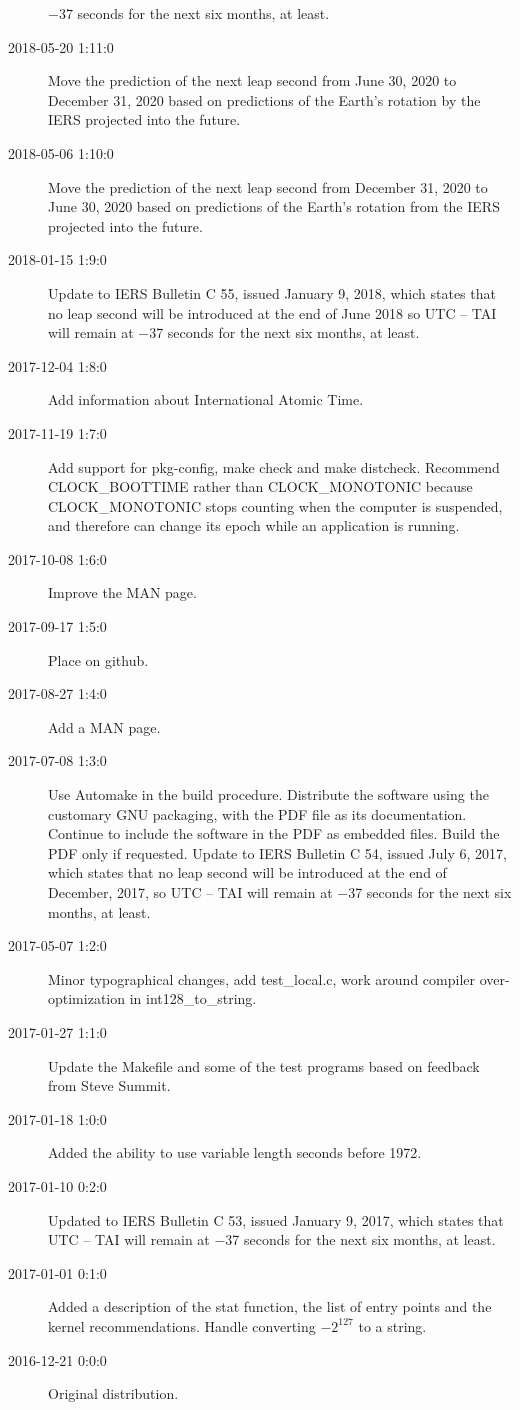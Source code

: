 \documentclass[letterpaper,twoside]{article}
\begin{document}
\begin{description}
  \num{-37} seconds for the next six months, at least.
\item[2018-05-20 1:11:0] Move the prediction of the next leap second
  from June 30, 2020 to December 31, 2020 based on predictions of
  the Earth's rotation by the IERS projected into the future.
\item[2018-05-06 1:10:0] Move the prediction of the next leap second
  from December 31, 2020 to June 30, 2020 based on predictions
  of the Earth's rotation from the IERS projected into the future.
\item[2018-01-15 1:9:0] Update to IERS Bulletin C 55, issued
  January 9, 2018, which states that no leap second will be introduced
  at the end of June 2018 so UTC -- TAI will remain at \num{-37} seconds
  for the next six months, at least.
\item[2017-12-04 1:8:0] Add information about International Atomic Time.
\item[2017-11-19 1:7:0] Add support for pkg-config, make check and
  make distcheck.  Recommend CLOCK\_BOOTTIME rather than CLOCK\_MONOTONIC
  because CLOCK\_MONOTONIC stops counting when the computer is suspended,
  and therefore can change its epoch while an application is running.
\item[2017-10-08 1:6:0] Improve the MAN page.
\item[2017-09-17 1:5:0] Place on github.
\item[2017-08-27 1:4:0] Add a MAN page.
\item[2017-07-08 1:3:0] Use Automake in the build procedure.
  Distribute the software using the customary GNU packaging,
  with the PDF file as its documentation.  Continue to include
  the software in the PDF as embedded files.  Build the PDF
  only if requested.  Update to IERS Bulletin C 54, issued
  July 6, 2017, which states that no leap second will be introduced
  at the end of December, 2017, so UTC -- TAI will remain at
  \num{-37} seconds for the next six months, at least.
\item[2017-05-07 1:2:0] Minor typographical changes, add test\_local.c,
  work around compiler over-optimization in int128\_to\_string.
\item[2017-01-27 1:1:0] Update the Makefile and some of the test programs
  based on feedback from Steve Summit.
\item[2017-01-18 1:0:0] Added the ability to use variable length seconds
  before 1972.
\item[2017-01-10 0:2:0] Updated to IERS Bulletin C 53,
  issued January 9, 2017, which states that UTC -- TAI
  will remain at \num{-37} seconds for the next six months, at least.
\item[2017-01-01 0:1:0] Added a description of the stat function,
  the list of entry points and the kernel recommendations.
  Handle converting $-2^{127}$ to a string. 
\item[2016-12-21 0:0:0] Original distribution.
\end{description}


\end{document}
